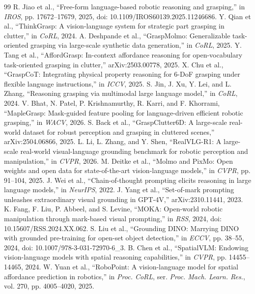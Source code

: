 \documentclass[journal]{IEEEtran}
\begin{document}
\begin{thebibliography}{99}
 R. Jiao et al., ``Free-form language-based robotic reasoning and grasping,'' in \emph{IROS}, pp. 17672--17679, 2025, doi: 10.1109/IROS60139.2025.11246686.
 Y. Qian et al., ``ThinkGrasp: A vision-language system for strategic part grasping in clutter,'' in \emph{CoRL}, 2024.
 A. Deshpande et al., ``GraspMolmo: Generalizable task-oriented grasping via large-scale synthetic data generation,'' in \emph{CoRL}, 2025.
 Y. Tang et al., ``AffordGrasp: In-context affordance reasoning for open-vocabulary task-oriented grasping in clutter,'' arXiv:2503.00778, 2025.
 X. Chu et al., ``GraspCoT: Integrating physical property reasoning for 6-DoF grasping under flexible language instructions,'' in \emph{ICCV}, 2025.
 S. Jin, J. Xu, Y. Lei, and L. Zhang, ``Reasoning grasping via multimodal large language model,'' in \emph{CoRL}, 2024.
 V. Bhat, N. Patel, P. Krishnamurthy, R. Karri, and F. Khorrami, ``MapleGrasp: Mask-guided feature pooling for language-driven efficient robotic grasping,'' in \emph{WACV}, 2026.
 S. Back et al., ``GraspClutter6D: A large-scale real-world dataset for robust perception and grasping in cluttered scenes,'' arXiv:2504.06866, 2025.
 L. Li, L. Zhang, and Y. Shen, ``RealVLG-R1: A large-scale real-world visual-language grounding benchmark for robotic perception and manipulation,'' in \emph{CVPR}, 2026.
 M. Deitke et al., ``Molmo and PixMo: Open weights and open data for state-of-the-art vision-language models,'' in \emph{CVPR}, pp. 91--104, 2025.
 J. Wei et al., ``Chain-of-thought prompting elicits reasoning in large language models,'' in \emph{NeurIPS}, 2022.
 J. Yang et al., ``Set-of-mark prompting unleashes extraordinary visual grounding in GPT-4V,'' arXiv:2310.11441, 2023.
 K. Fang, F. Liu, P. Abbeel, and S. Levine, ``MOKA: Open-world robotic manipulation through mark-based visual prompting,'' in \emph{RSS}, 2024, doi: 10.15607/RSS.2024.XX.062.
 S. Liu et al., ``Grounding DINO: Marrying DINO with grounded pre-training for open-set object detection,'' in \emph{ECCV}, pp. 38--55, 2024, doi: 10.1007/978-3-031-72970-6\_3.
 B. Chen et al., ``SpatialVLM: Endowing vision-language models with spatial reasoning capabilities,'' in \emph{CVPR}, pp. 14455--14465, 2024.
 W. Yuan et al., ``RoboPoint: A vision-language model for spatial affordance prediction in robotics,'' in \emph{Proc. CoRL}, ser. \emph{Proc. Mach. Learn. Res.}, vol. 270, pp. 4005--4020, 2025.

\end{thebibliography}
\end{document}
